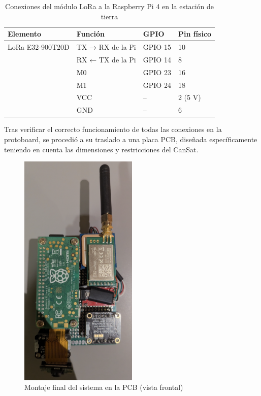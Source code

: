 \begin{table}[H]
    \centering
    \renewcommand{\arraystretch}{1.2}
    \begin{tabular}{|l|l|l|l|}
        \hline
        \textbf{Elemento} & \textbf{Función} & \textbf{GPIO} & \textbf{Pin físico} \\ \hline
        LoRa E32-900T20D  & TX → RX de la Pi & GPIO 15       & 10                  \\ \cline{2-4}
        & RX ← TX de la Pi & GPIO 14       & 8                   \\ \cline{2-4}
        & M0               & GPIO 23       & 16                  \\ \cline{2-4}
        & M1               & GPIO 24       & 18                  \\ \cline{2-4}
        & VCC              & --            & 2 (5 V)             \\ \cline{2-4}
        & GND              & --            & 6                   \\ \hline
    \end{tabular}
    \caption{Conexiones del módulo LoRa a la Raspberry Pi 4 en la estación de tierra}
    \label{tab:conexiones_ground_pi4}
\end{table}


Tras verificar el correcto funcionamiento de todas las conexiones en la protoboard, se procedió a su traslado a una placa PCB,
diseñada específicamente teniendo en cuenta las dimensiones y restricciones del CanSat.

\begin{figure}[H]
    \centering
    \includegraphics[width=0.5\textwidth]{Imagenes/Bitmap/pcb_montaje_frontal}
    \caption{Montaje final del sistema en la PCB (vista frontal)}
    \label{fig:pcb_montaje_frontal}
\end{figure}

